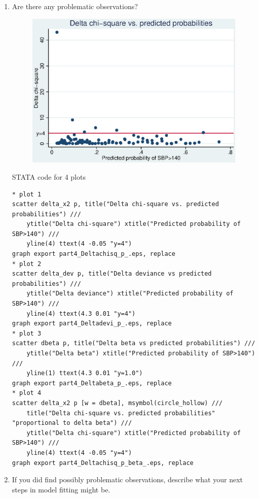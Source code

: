 \documentclass{article}
\begin{document}
  \begin{enumerate}
    \item Are there any problematic observations?
    \begin{figure}
    \centering
    \includegraphics[width=.8\linewidht]{04/part4_Deltachisq_p_.eps}
    \end{figure}

      STATA code for 4 plots
      \begin{verbatim}
* plot 1
scatter delta_x2 p, title("Delta chi-square vs. predicted probabilities") ///
	ytitle("Delta chi-square") xtitle("Predicted probability of SBP>140") ///
	yline(4) ttext(4 -0.05 "y=4")
graph export part4_Deltachisq_p_.eps, replace
* plot 2
scatter delta_dev p, title("Delta deviance vs predicted probabilities") ///
	ytitle("Delta deviance") xtitle("Predicted probability of SBP>140") ///
	yline(4) ttext(4.3 0.01 "y=4")
graph export part4_Deltadevi_p_.eps, replace
* plot 3 
scatter dbeta p, title("Delta beta vs predicted probabilities") ///
	ytitle("Delta beta") xtitle("Predicted probability of SBP>140") ///
	yline(1) ttext(4.3 0.01 "y=1.0")
graph export part4_Deltabeta_p_.eps, replace
* plot 4
scatter delta_x2 p [w = dbeta], msymbol(circle_hollow) ///
	title("Delta chi-square vs. predicted probabilities" "proportional to delta beta") ///
	ytitle("Delta chi-square") xtitle("Predicted probability of SBP>140") ///
	yline(4) ttext(4 -0.05 "y=4")
graph export part4_Deltachisq_p_beta_.eps, replace
    \end{verbatim}
      
      
      \item If you did find possibly problematic observations, describe what your next steps in model fitting might be.
  \end{enumerate}
\end{document}
